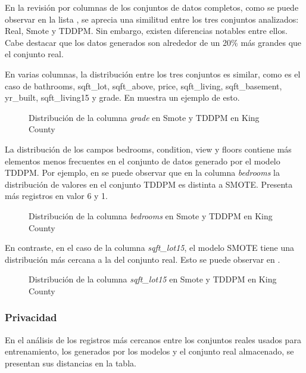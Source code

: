 \newpage

En la revisión por columnas de los conjuntos de datos completos, como se puede observar en la lista , se aprecia una similitud entre los tres conjuntos analizados: Real, Smote y TDDPM. Sin embargo, existen diferencias notables entre ellos. Cabe destacar que los datos generados son alrededor de un 20\% más grandes que el conjunto real.

En varias columnas, la distribución entre los tres conjuntos es similar, como es el caso de bathrooms, sqft\_lot, sqft\_above, price, sqft\_living, sqft\_basement, yr\_built, sqft\_living15 y grade. En  muestra un ejemplo de esto.

\begin{figure}[H]
    \centering
    
    \caption{Distribución de la columna \emph{grade} en Smote y TDDPM en King County}
    \label{top2-field_grade}
\end{figure}


\newpage
La distribución de los campos bedrooms, condition, view y floors contiene más elementos menos frecuentes en el conjunto de datos generado por el modelo TDDPM. Por ejemplo, en  se puede observar que en la columna \emph{bedrooms} la distribución de valores en el conjunto TDDPM es distinta a SMOTE. Presenta más registros en valor 6 y 1.

\begin{figure}[H]
    \centering
    
    \caption{Distribución de la columna \emph{bedrooms} en Smote y TDDPM en King County}
    \label{top2-field_bedrooms}
\end{figure}

\newpage
En contraste, en el caso de la columna \emph{sqft\_lot15}, el modelo SMOTE tiene una distribución más cercana a la del conjunto real. Esto se puede observar en .

\begin{figure}[H]
    \centering
    
    \caption{Distribución de la columna \emph{sqft\_lot15} en Smote y TDDPM en King County}
    \label{top2-field_sqft_lot15}
\end{figure}

\newpage
\subsubsection{Privacidad}
En el análisis de los registros más cercanos entre los conjuntos reales usados para entrenamiento, los generados por los modelos y el conjunto real almacenado, se presentan sus distancias en la tabla.

